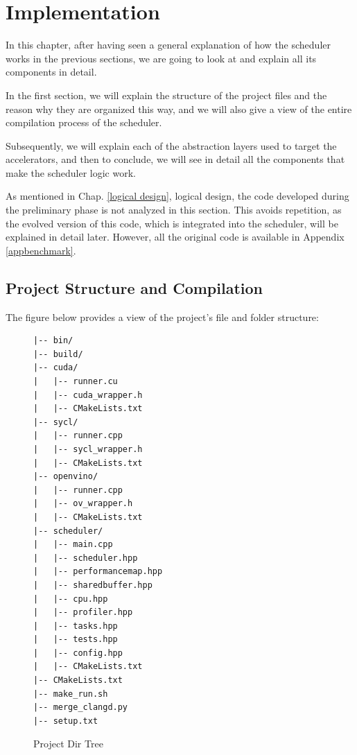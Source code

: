 \chapter{Implementation}
\label{implementation}

In this chapter, after having seen a general explanation of how the scheduler works in the previous sections, we are going to look at and explain all its components in detail.

In the first section, we will explain the structure of the project files and the reason why they are organized this way, and we will also give a view of the entire compilation process of the scheduler.

Subsequently, we will explain each of the abstraction layers used to target the accelerators, and then to conclude, we will see in detail all the components that make the scheduler logic work.

As mentioned in Chap. \ref{logical design}, logical design, the code developed during the preliminary phase is not analyzed in this section. This avoids repetition, as the evolved version of this code, which is integrated into the scheduler, will be explained in detail later. However, all the original code is available in Appendix \ref{appbenchmark}.

\clearpage 

\section{Project Structure and Compilation}
The figure below provides a view of the project's file and folder structure:

\vspace{0.5cm}

\begin{figure}[h!]
\centering
\begin{tcolorbox}[
    colback=white,      
    colframe=black!75,  
    title=\textbf{Project Tree},
    arc=2mm        
]

\begin{verbatim}
|-- bin/
|-- build/
|-- cuda/
|   |-- runner.cu
|   |-- cuda_wrapper.h
|   |-- CMakeLists.txt
|-- sycl/
|   |-- runner.cpp
|   |-- sycl_wrapper.h
|   |-- CMakeLists.txt
|-- openvino/
|   |-- runner.cpp
|   |-- ov_wrapper.h
|   |-- CMakeLists.txt
|-- scheduler/
|   |-- main.cpp
|   |-- scheduler.hpp
|   |-- performancemap.hpp
|   |-- sharedbuffer.hpp
|   |-- cpu.hpp
|   |-- profiler.hpp
|   |-- tasks.hpp
|   |-- tests.hpp
|   |-- config.hpp
|   |-- CMakeLists.txt
|-- CMakeLists.txt
|-- make_run.sh
|-- merge_clangd.py
|-- setup.txt
\end{verbatim}
\end{tcolorbox}
\caption{Project Dir Tree}
\label{code_tree}
\end{figure}


